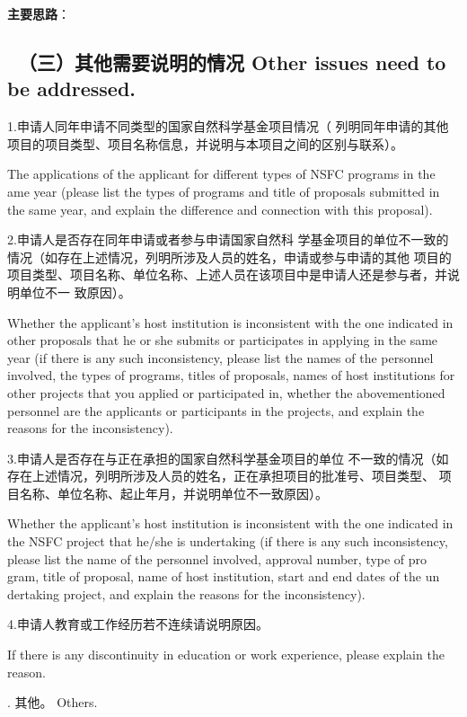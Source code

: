 \documentclass[12pt,UTF8,AutoFakeBold=2,a4paper]{ctexart}
\begin{document}
\textbf{主要思路}：


{\color{MsBlue} \subsection{\sihao \kaishu \quad \ \bfseries（三）其他需要说明的情况 
\xiaosihao {} Other issues need to be addressed.}}
%

{\sihao \color{MsBlue} \kaishu 1.申请人同年申请不同类型的国家自然科学基金项目情况（
列明同年申请的其他项目的项目类型、项目名称信息，并说明与本项目之间的区别与联系）。}

{\color{MsBlue} \xiaosihao {} 
The applications of the applicant for different types of NSFC programs in the 
ame year (please list the types of programs and title of proposals submitted 
in the same year, and explain the difference and connection with this proposal).}


{\sihao \color{MsBlue} \kaishu 2.申请人是否存在同年申请或者参与申请国家自然科
学基金项目的单位不一致的情况（如存在上述情况，列明所涉及人员的姓名，申请或参与申请的其他
项目的项目类型、项目名称、单位名称、上述人员在该项目中是申请人还是参与者，并说明单位不一
致原因）。}

{\color{MsBlue} \xiaosihao {} 
Whether the applicant's host institution is inconsistent with the one indicated 
in other proposals that he or she submits or participates in applying in the 
same year (if there is any such inconsistency, please list the names of the 
personnel involved, the types of programs, titles of proposals, names of host 
institutions for other projects that you applied or participated in, whether 
the abovementioned personnel are the applicants or participants in the projects, 
and explain the reasons for the inconsistency).}


{\sihao \color{MsBlue} \kaishu 3.申请人是否存在与正在承担的国家自然科学基金项目的单位
不一致的情况（如存在上述情况，列明所涉及人员的姓名，正在承担项目的批准号、项目类型、
项目名称、单位名称、起止年月，并说明单位不一致原因）。}

{\color{MsBlue} \xiaosihao {} 
Whether the applicant's host institution is inconsistent with the one indicated 
in the NSFC project that he/she is undertaking (if there is any such inconsistency, please list the name of the personnel involved, approval number, type of pro
gram, title of proposal, name of host institution, start and end dates of the un
dertaking project, and explain the reasons for the inconsistency).}


{\sihao \color{MsBlue} \kaishu 4.申请人教育或工作经历若不连续请说明原因。}

{\color{MsBlue} \xiaosihao {} 
If there is any discontinuity in education or work experience, please explain 
the reason.}

{\sihao \color{MsBlue} . 其他。 
\xiaosihao {} Others.}


\end{document}
